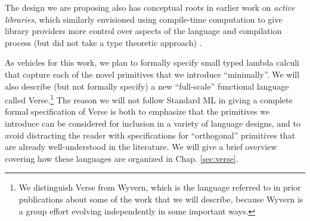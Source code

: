 The design we are proposing also has conceptual roots in earlier work on \emph{active libraries}, which similarly envisioned using compile-time computation to give library providers more control over aspects of the language and compilation process (but did not take a type theoretic approach) \cite{active-libraries-thesis}. %

As vehicles for this work, we plan to formally specify small typed lambda calculi that capture each of the novel primitives that we introduce ``minimally''. We will also describe (but not formally specify) a new ``full-scale'' functional language called Verse.\footnote{We distinguish Verse from Wyvern, which is the language referred to in prior publications about some of the work that we will describe, because Wyvern is a group effort evolving independently in some important ways.} The reason we will not follow Standard ML \cite{mthm97-for-dart} in giving a complete formal specification of Verse is both to emphasize that the primitives we introduce can be considered for inclusion in a variety of language designs, and to avoid distracting the reader with specifications for ``orthogonal'' primitives that are already well-understood in the literature. %
We will give a brief overview covering how these languages are organized in Chap. \ref{sec:verse}.

